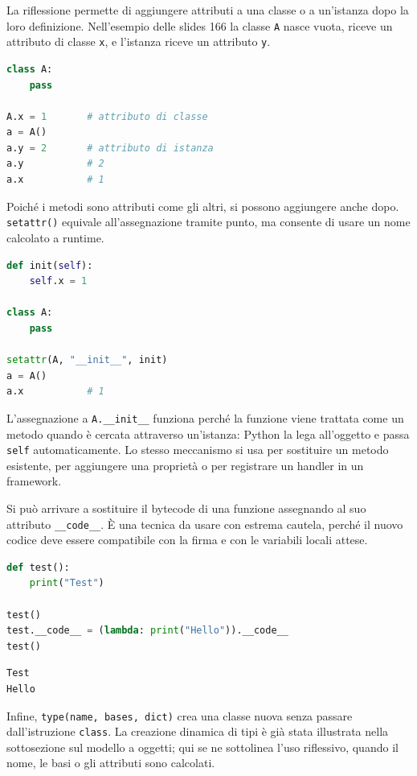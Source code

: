 \documentclass[12pt]{extarticle}
\begin{document}
\noindent La riflessione permette di aggiungere attributi a una classe o a un'istanza dopo la loro definizione. Nell'esempio delle slides 166 la classe \texttt{A} nasce vuota, riceve un attributo di classe \texttt{x}, e l'istanza riceve un attributo \texttt{y}.

\begin{lstlisting}[language=Python]
class A:
    pass

A.x = 1       # attributo di classe
a = A()
a.y = 2       # attributo di istanza
a.y           # 2
a.x           # 1
\end{lstlisting}

\noindent Poiché i metodi sono attributi come gli altri, si possono aggiungere anche dopo. \texttt{setattr()} equivale all'assegnazione tramite punto, ma consente di usare un nome calcolato a runtime.

\begin{lstlisting}[language=Python]
def init(self):
    self.x = 1

class A:
    pass

setattr(A, "__init__", init)
a = A()
a.x           # 1
\end{lstlisting}

\noindent L'assegnazione a \texttt{A.\_\_init\_\_} funziona perché la funzione viene trattata come un metodo quando è cercata attraverso un'istanza: Python la lega all'oggetto e passa \texttt{self} automaticamente. Lo stesso meccanismo si usa per sostituire un metodo esistente, per aggiungere una proprietà o per registrare un handler in un framework.

\noindent Si può arrivare a sostituire il bytecode di una funzione assegnando al suo attributo \texttt{\_\_code\_\_}. È una tecnica da usare con estrema cautela, perché il nuovo codice deve essere compatibile con la firma e con le variabili locali attese.

\begin{lstlisting}[language=Python]
def test():
    print("Test")

test()
test.__code__ = (lambda: print("Hello")).__code__
test()
\end{lstlisting}

\begin{lstlisting}[numbers=none]
Test
Hello
\end{lstlisting}

\noindent Infine, \texttt{type(name, bases, dict)} crea una classe nuova senza passare dall'istruzione \texttt{class}. La creazione dinamica di tipi è già stata illustrata nella sottosezione sul modello a oggetti; qui se ne sottolinea l'uso riflessivo, quando il nome, le basi o gli attributi sono calcolati.
\end{document}
